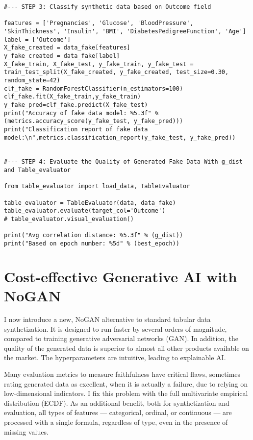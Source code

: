 \documentclass[oneside,10pt]{book}
\begin{document}
\begin{lstlisting}
#--- STEP 3: Classify synthetic data based on Outcome field

features = ['Pregnancies', 'Glucose', 'BloodPressure', 'SkinThickness', 'Insulin', 'BMI', 'DiabetesPedigreeFunction', 'Age']
label = ['Outcome']
X_fake_created = data_fake[features]
y_fake_created = data_fake[label]
X_fake_train, X_fake_test, y_fake_train, y_fake_test = train_test_split(X_fake_created, y_fake_created, test_size=0.30, random_state=42)
clf_fake = RandomForestClassifier(n_estimators=100)
clf_fake.fit(X_fake_train,y_fake_train)
y_fake_pred=clf_fake.predict(X_fake_test)
print("Accuracy of fake data model: %5.3f" % (metrics.accuracy_score(y_fake_test, y_fake_pred)))
print("Classification report of fake data model:\n",metrics.classification_report(y_fake_test, y_fake_pred))


#--- STEP 4: Evaluate the Quality of Generated Fake Data With g_dist and Table_evaluator

from table_evaluator import load_data, TableEvaluator

table_evaluator = TableEvaluator(data, data_fake)
table_evaluator.evaluate(target_col='Outcome')
# table_evaluator.visual_evaluation()

print("Avg correlation distance: %5.3f" % (g_dist))
print("Based on epoch number: %5d" % (best_epoch))
\end{lstlisting}


\chapter{Cost-effective Generative AI with NoGAN}\label{chnogan}

I now introduce a new, NoGAN alternative to standard tabular data synthetization. It is designed to run faster by several orders of magnitude, compared to training generative adversarial networks (GAN). In addition, the quality of the generated data is superior to almost all other products available on the market. The hyperparameters are intuitive, leading to explainable AI.

Many evaluation metrics to measure faithfulness have critical flaws, sometimes rating generated data as excellent, when it is actually a failure, due to relying on low-dimensional indicators. I fix this problem with the full multivariate empirical distribution (ECDF). As an additional benefit, both for synthetization and evaluation, all types of features — categorical, ordinal, or continuous — are processed with a single formula, regardless of type, even in the presence of missing values.
\end{document}
